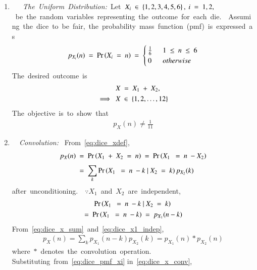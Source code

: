 \documentclass[journal,12pt,twocolumn]{IEEEtran}
\renewcommand\thesection{\arabic{section}}
\begin{document}
 \renewcommand{\theequation}{\theenumi} 
 \renewcommand{\thefigure}{\theenumi} 
 \begin{enumerate}[label=\thesection.\arabic*.,ref=\thesection.\theenumi] 
  
  
 \item  {\em The Uniform Distribution: }Let $X_i \in \cbrak{1,2,3,4,5,6}, i = 1,2,$ be the random variables representing the outcome for each die.  Assuming the dice to be fair, the probability mass function (pmf) is expressed as  
 \begin{align} 
 \label{eq:dice_pmf_xi} 
 p_{X_i}(n) = \pr{X_i = n} =  
 \begin{cases} 
 \frac{1}{6} & 1 \le n \le 6 
 \\ 
 0 & otherwise 
 \end{cases} 
 \end{align} 
 The desired outcome is 
 \begin{align} 
 \label{eq:dice_xdef} 
 X &= X_1 + X_2, 
 \\ 
 \implies X &\in \cbrak{1,2,\dots,12} 
 \end{align} 
 The objective is to show that 
 \begin{align} 
 p_X(n) \ne \frac{1}{11} 
 \label{eq:dice_wrong} 
 \end{align} 
 \item {\em Convolution: } 
 From \eqref{eq:dice_xdef}, 
 \begin{align} 
 p_X(n) &= \pr{X_1 + X_2 = n} = \pr{X_1  = n -X_2} 
 \\ 
 &= \sum_{k}^{}\pr{X_1  = n -k | X_2 = k}p_{X_2}(k) 
 \label{eq:dice_x_sum} 
 \end{align} 
 after unconditioning.  $\because X_1$ and $X_2$ are independent, 
 \begin{multline} 
 \pr{X_1  = n -k | X_2 = k}  
 \\ 
 = \pr{X_1  = n -k} = p_{X_1}(n-k) 
 \label{eq:dice_x1_indep} 
 \end{multline} 
 From \eqref{eq:dice_x_sum} and \eqref{eq:dice_x1_indep}, 
 \begin{align} 
 p_X(n) = \sum_{k}^{}p_{X_1}(n-k)p_{X_2}(k) = p_{X_1}(n)*p_{X_2}(n) 
 \label{eq:dice_x_conv} 
 \end{align} 
 where $*$ denotes the convolution operation.  
 Substituting from \eqref{eq:dice_pmf_xi} 
 in \eqref{eq:dice_x_conv}, 
 \begin{align} 

\end{align}
\end{enumerate}
\end{document}
